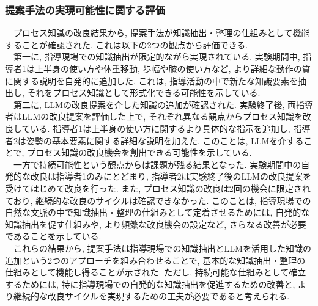 \subsubsection{提案手法の実現可能性に関する評価}
　プロセス知識の改良結果から, 提案手法が知識抽出・整理の仕組みとして機能することが確認された. これは以下の2つの観点から評価できる.  \\

　第一に, 指導現場での知識抽出が限定的ながら実現されている. 実験期間中, 指導者1は上半身の使い方や体重移動, 歩幅や膝の使い方など, より詳細な動作の質に関する説明を自発的に追加した. これは, 指導活動の中で新たな知識要素を抽出し, それをプロセス知識として形式化できる可能性を示している.  \\

　第二に, LLMの改良提案を介した知識の追加が確認された. 実験終了後, 両指導者はLLMの改良提案を評価した上で, それぞれ異なる観点からプロセス知識を改良している. 指導者1は上半身の使い方に関するより具体的な指示を追加し, 指導者2は姿勢の基本要素に関する詳細な説明を加えた. このことは, LLMを介することで, プロセス知識の改良機会を創出できる可能性を示している.  \\

　一方で持続可能性という観点からは課題が残る結果となった. 実験期間中の自発的な改良は指導者1のみにとどまり, 指導者2は実験終了後のLLMの改良提案を受けてはじめて改良を行った. また, プロセス知識の改良は2回の機会に限定されており, 継続的な改良のサイクルは確認できなかった. このことは, 指導現場での自然な文脈の中で知識抽出・整理の仕組みとして定着させるためには, 自発的な知識抽出を促す仕組みや, より頻繁な改良機会の設定など, さらなる改善が必要であることを示している.  \\

　これらの結果から, 提案手法は指導現場での知識抽出とLLMを活用した知識の追加という2つのアプローチを組み合わせることで, 基本的な知識抽出・整理の仕組みとして機能し得ることが示された. ただし, 持続可能な仕組みとして確立するためには, 特に指導現場での自発的な知識抽出を促進するための改善と, より継続的な改良サイクルを実現するための工夫が必要であると考えられる.  \\

